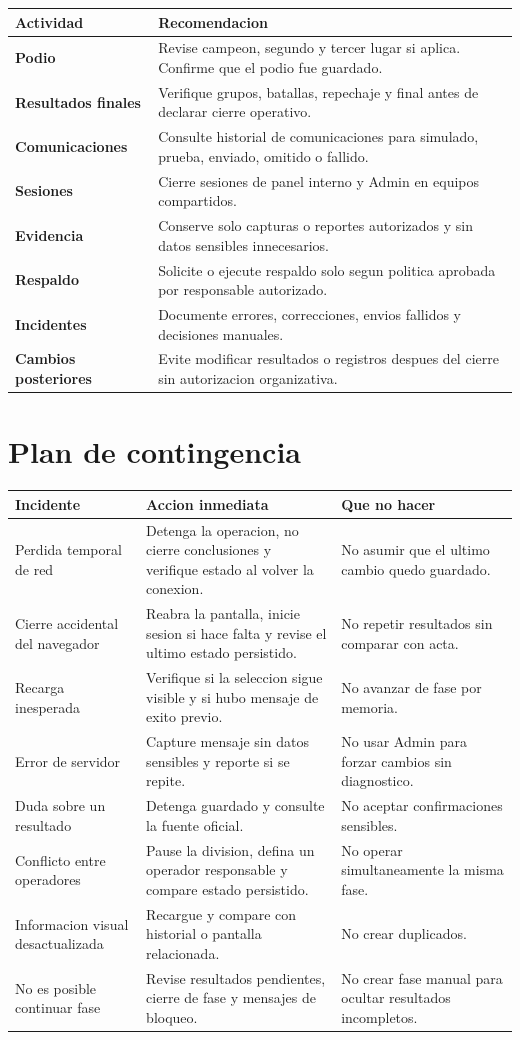 \begin{tabularx}{\linewidth}{>{\bfseries}p{4cm}X}
\toprule
Actividad & Recomendacion\\
\midrule
Podio & Revise campeon, segundo y tercer lugar si aplica. Confirme que el podio fue guardado.\\
Resultados finales & Verifique grupos, batallas, repechaje y final antes de declarar cierre operativo.\\
Comunicaciones & Consulte historial de comunicaciones para simulado, prueba, enviado, omitido o fallido.\\
Sesiones & Cierre sesiones de panel interno y Admin en equipos compartidos.\\
Evidencia & Conserve solo capturas o reportes autorizados y sin datos sensibles innecesarios.\\
Respaldo & Solicite o ejecute respaldo solo segun politica aprobada por responsable autorizado.\\
Incidentes & Documente errores, correcciones, envios fallidos y decisiones manuales.\\
Cambios posteriores & Evite modificar resultados o registros despues del cierre sin autorizacion organizativa.\\
\bottomrule
\end{tabularx}

\section{Plan de contingencia}

\begin{longtable}{p{3.6cm}p{5.9cm}p{3.6cm}}
\toprule
Incidente & Accion inmediata & Que no hacer\\
\midrule
\endhead
Perdida temporal de red & Detenga la operacion, no cierre conclusiones y verifique estado al volver la conexion. & No asumir que el ultimo cambio quedo guardado.\\
Cierre accidental del navegador & Reabra la pantalla, inicie sesion si hace falta y revise el ultimo estado persistido. & No repetir resultados sin comparar con acta.\\
Recarga inesperada & Verifique si la seleccion sigue visible y si hubo mensaje de exito previo. & No avanzar de fase por memoria.\\
Error de servidor & Capture mensaje sin datos sensibles y reporte si se repite. & No usar Admin para forzar cambios sin diagnostico.\\
Duda sobre un resultado & Detenga guardado y consulte la fuente oficial. & No aceptar confirmaciones sensibles.\\
Conflicto entre operadores & Pause la division, defina un operador responsable y compare estado persistido. & No operar simultaneamente la misma fase.\\
Informacion visual desactualizada & Recargue y compare con historial o pantalla relacionada. & No crear duplicados.\\
No es posible continuar fase & Revise resultados pendientes, cierre de fase y mensajes de bloqueo. & No crear fase manual para ocultar resultados incompletos.\\
\bottomrule
\end{longtable}

